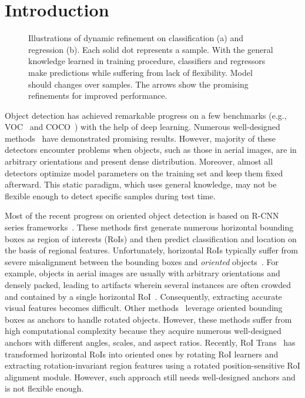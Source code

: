 \documentclass[10pt,twocolumn,letterpaper]{article}
\begin{document}
\section{Introduction}
\begin{figure}\centering
{}
\caption{Illustrations of dynamic refinement on classification (a) and regression (b).
Each solid dot represents a sample. 
With the general knowledge learned in training procedure, classifiers and regressors make predictions while suffering from lack of flexibility. Model should changes over samples. The arrows show the promising refinements for improved performance.}
\label{fig:cr}
\end{figure} Object detection has achieved remarkable progress on a few benchmarks (e.g., VOC~\cite{everingham2010pascal} and COCO~\cite{Lin:2014:COCO}) with the help of deep learning. Numerous well-designed methods~\cite{ren2015faster,zhou2019objects,zhu2019feature,redmon2018yolov3,Borji:2019:SOD} have demonstrated promising results. However, majority of these detectors encounter problems when objects, such as those in aerial images, are in arbitrary orientations and present dense distribution.
Moreover, almost all detectors optimize model parameters on the training set and keep them fixed afterward.
This static paradigm, which uses general knowledge, may not be flexible enough to detect specific samples during test time.

Most of the recent progress on oriented object detection is based on R-CNN series frameworks~\cite{girshick2014rich,girshick2015fast,ren2015faster}. These methods first generate numerous horizontal bounding boxes as region of interests (RoIs) and then predict classification and location on the basis of regional features.
Unfortunately, horizontal RoIs typically suffer from severe misalignment between the bounding boxes and \emph{oriented} objects~\cite{xia2018dota,liu2016ship}.
For example, objects in aerial images are usually with arbitrary orientations and densely packed, leading to artifacts wherein several instances are often crowded and contained by a single horizontal RoI~\cite{ding2019learning}. Consequently, extracting accurate visual features becomes difficult. Other methods~\cite{xia2018dota, liu2015fast,liu2016ship,liu2017rotated} leverage oriented bounding boxes as anchors to handle rotated objects.
However, these methods suffer from high computational complexity because they acquire numerous well-designed anchors with different angles, scales, and aspect ratios.
Recently, RoI Trans~\cite{ding2019learning} has transformed horizontal RoIs into oriented ones by rotating RoI learners and extracting rotation-invariant region features using a rotated position-sensitive RoI alignment module.
However, such approach still needs well-designed anchors and is not flexible enough.
\end{document}
